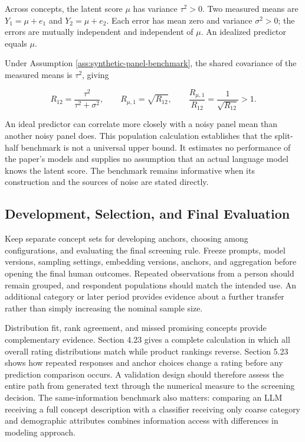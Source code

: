 \begin{assumption}
\label{ass:synthetic-panel-benchmark}
Across concepts, the latent score $\mu$ has variance $\tau^2>0$. Two measured means are $Y_1=\mu+e_1$ and $Y_2=\mu+e_2$. Each error has mean zero and variance $\sigma^2>0$; the errors are mutually independent and independent of $\mu$. An idealized predictor equals $\mu$.
\end{assumption}

Under Assumption \ref{ass:synthetic-panel-benchmark}, the shared
covariance of the measured means is \(\tau^2\), giving

\[
R_{12}=\frac{\tau^2}{\tau^2+\sigma^2},\qquad
R_{\mu,1}=\sqrt{R_{12}},\qquad
\frac{R_{\mu,1}}{R_{12}}=\frac{1}{\sqrt{R_{12}}}>1.
\]

An ideal predictor can correlate more closely with a noisy panel mean
than another noisy panel does. This population calculation establishes
that the split-half benchmark is not a universal upper bound. It
estimates no performance of the paper's models and supplies no
assumption that an actual language model knows the latent score. The
benchmark remains informative when its construction and the sources of
noise are stated directly.

\hypertarget{M07-development-selection-and-final-evaluation}{%
\subsection{Development, Selection, and Final
Evaluation}\label{M07-development-selection-and-final-evaluation}}

\noindent \noindent Keep separate concept sets for developing anchors, choosing
among configurations, and evaluating the final screening rule. Freeze
prompts, model versions, sampling settings, embedding versions, anchors,
and aggregation before opening the final human outcomes. Repeated
observations from a person should remain grouped, and respondent
populations should match the intended use. An additional category or
later period provides evidence about a further transfer rather than
simply increasing the nominal sample size.

Distribution fit, rank agreement, and missed promising concepts provide
complementary evidence. Section 4.23 gives a complete calculation in
which all overall rating distributions match while product rankings
reverse. Section 5.23 shows how repeated responses and anchor choices
change a rating before any prediction comparison occurs. A validation
design should therefore assess the entire path from generated text
through the numerical measure to the screening decision. The
same-information benchmark also matters: comparing an LLM receiving a
full concept description with a classifier receiving only coarse
category and demographic attributes combines information access with
differences in modeling approach.


